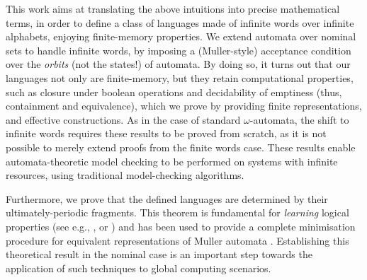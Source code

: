 This work aims at translating the above intuitions into precise mathematical terms, in order to define a class of languages made of infinite words over infinite alphabets, enjoying finite-memory properties. We extend automata over nominal sets to handle infinite words, by imposing a (Muller-style) acceptance condition 
over the \emph{orbits} (not the states!) of automata. By doing so, it turns out that our languages not only are finite-memory, but they retain computational properties, such as closure under boolean operations and decidability of emptiness (thus, containment and equivalence), which we prove by providing finite representations, and effective constructions. As in the case of standard $\omega$-automata, the shift to infinite words requires these results to be proved from scratch, as it is not possible to merely extend proofs from the finite words case. These results enable automata-theoretic model checking to be performed on systems with infinite resources, using traditional model-checking algorithms. 

Furthermore, we prove that the defined languages are determined by their ultimately-periodic fragments. This theorem is fundamental for \emph{learning} logical properties (see e.g., \cite{MP95}, or \cite{FCCTW08}) and has been used to provide a complete minimisation procedure for equivalent representations of Muller automata \cite{CV12}. Establishing this theoretical result in the nominal case is an important step towards the application of such techniques to global computing scenarios.